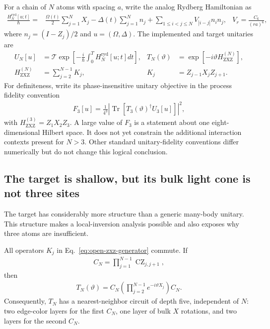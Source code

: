 For a chain of $N$ atoms with spacing $a$, write the analog Rydberg Hamiltonian
as
\begin{align}
\frac{H_N^{\mathrm{ryd}}[u;t]}{\hbar}
={}&\frac{\Omega(t)}{2}\sum_{j=1}^{N}X_j
-\Delta(t)\sum_{j=1}^{N}n_j
+\sum_{1\leq i<j\leq N}V_{|i-j|}n_i n_j,
&
V_r=\frac{C_6}{(ra)^6},
\label{eq:rydberg-zxz-family}
\end{align}
where $n_j=(I-Z_j)/2$ and $u=(\Omega,\Delta)$.  The implemented and target
unitaries are
\begin{align}
U_N[u]
&=\mathcal T\exp\left[-\frac{i}{\hbar}\int_0^T
H_N^{\mathrm{ryd}}[u;t]dt\right],
&
T_N(\vartheta)
&=\exp[-i\vartheta H_{\mathrm{ZXZ}}^{(N)}],
\label{eq:implemented-and-target-zxz}\\
H_{\mathrm{ZXZ}}^{(N)}
&=\sum_{j=2}^{N-1}K_j,
&
K_j&=Z_{j-1}X_jZ_{j+1}.
\label{eq:open-zxz-generator}
\end{align}
For definiteness, write its phase-insensitive unitary objective in the process
fidelity convention
\begin{align}
F_3[u]=\frac{1}{4^3}\left|\operatorname{Tr}
\left[T_3(\vartheta)^\dagger U_3[u]\right]\right|^2,
\label{eq:three-atom-process-fidelity}
\end{align}
with $H_{\mathrm{ZXZ}}^{(3)}=Z_1X_2Z_3$.  A large value of
$F_3$ is a statement about one eight-dimensional Hilbert space.  It does not
yet constrain the additional interaction contexts present for $N>3$.  Other
standard unitary-fidelity conventions differ numerically but do not change
this logical conclusion.

\subsection{The target is shallow, but its bulk light cone is not three sites}

The target has considerably more structure than a generic many-body unitary.
This structure makes a local-inversion analysis possible and also exposes why
three atoms are insufficient.

\begin{proposition}
\label{prop:zxz-shallow-representation}
All operators $K_j$ in Eq.~\eqref{eq:open-zxz-generator} commute.  If
\begin{align}
C_N=\prod_{j=1}^{N-1}\operatorname{CZ}_{j,j+1},
\end{align}
then
\begin{align}
T_N(\vartheta)
=C_N\left(\prod_{j=2}^{N-1}e^{-i\vartheta X_j}\right)C_N.
\label{eq:zxz-exact-circuit}
\end{align}
Consequently, $T_N$ has a nearest-neighbor circuit of depth five, independent
of $N$: two edge-color layers for the first $C_N$, one layer of bulk
$X$ rotations, and two layers for the second $C_N$.
\end{proposition}


